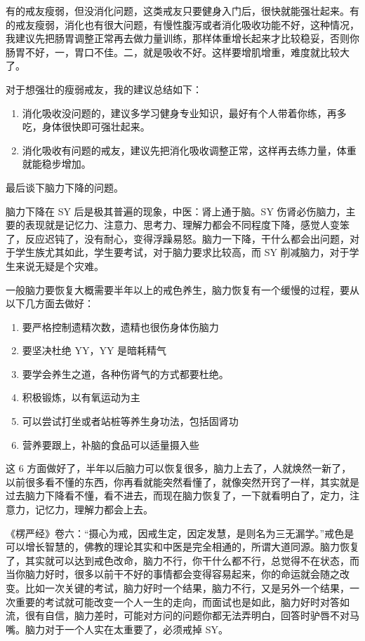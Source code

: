 \documentclass[fontset=founder]{ctexart}
\begin{document}
有的戒友瘦弱，但没消化问题，这类戒友只要健身入门后，很快就能强壮起来。有的戒友瘦弱，消化也有很大问题，有慢性腹泻或者消化吸收功能不好，这种情况，我建议先把肠胃调整正常再去做力量训练，那样体重增长起来才比较稳妥，否则你肠胃不好，一，胃口不佳。二，就是吸收不好。这样要增肌增重，难度就比较大了。

对于想强壮的瘦弱戒友，我的建议总结如下：

\begin{enumerate}
    \item 消化吸收没问题的，建议多学习健身专业知识，最好有个人带着你练，再多吃，身体很快即可强壮起来。
    \item 消化吸收有问题的戒友，建议先把消化吸收调整正常，这样再去练力量，体重就能稳步增加。
\end{enumerate}

最后谈下脑力下降的问题。

脑力下降在 SY 后是极其普遍的现象，中医：肾上通于脑。SY 伤肾必伤脑力，主要的表现就是记忆力、注意力、思考力、理解力都会不同程度下降，感觉人变笨了，反应迟钝了，没有耐心，变得浮躁易怒。脑力一下降，干什么都会出问题，对于学生族尤其如此，学生要考试，对于脑力要求比较高，而 SY 削减脑力，对于学生来说无疑是个灾难。

一般脑力要恢复大概需要半年以上的戒色养生，脑力恢复有一个缓慢的过程，要从以下几方面去做好：

\begin{enumerate}
    \item 要严格控制遗精次数，遗精也很伤身体伤脑力
    \item 要坚决杜绝 YY，YY 是暗耗精气
    \item 要学会养生之道，各种伤肾气的方式都要杜绝。
    \item 积极锻炼，以有氧运动为主
    \item 可以尝试打坐或者站桩等养生身功法，包括固肾功
    \item 营养要跟上，补脑的食品可以适量摄入些
\end{enumerate}

这 6 方面做好了，半年以后脑力可以恢复很多，脑力上去了，人就焕然一新了，以前很多看不懂的东西，你再看就能突然看懂了，就像突然开窍了一样，其实就是过去脑力下降看不懂，看不进去，而现在脑力恢复了，一下就看明白了，定力，注意力，记忆力，理解力都会上去。

《楞严经》卷六：“摄心为戒，因戒生定，因定发慧，是则名为三无漏学。”戒色是可以增长智慧的，佛教的理论其实和中医是完全相通的，所谓大道同源。脑力恢复了，其实就可以达到戒色改命，脑力不行，你干什么都不行，总觉得不在状态，而当你脑力好时，很多以前干不好的事情都会变得容易起来，你的命运就会随之改变。比如一次关键的考试，脑力好时一个结果，脑力不行，又是另外一个结果，一次重要的考试就可能改变一个人一生的走向，而面试也是如此，脑力好时对答如流，很有自信，脑力差时，可能对方问的问题你都无法弄明白，回答时驴唇不对马嘴。脑力对于一个人实在太重要了，必须戒掉 SY。
\end{document}

